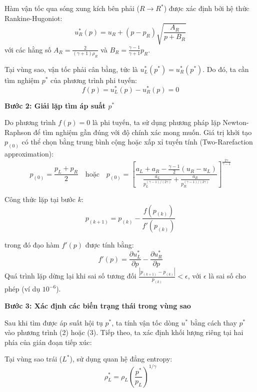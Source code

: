 Hàm vận tốc qua sóng xung kích bên phải ($R \to R^*$) được xác định bởi hệ thức Rankine-Hugoniot:
\begin{equation*}
    u_R^*(p) = u_R + (p - p_R) \sqrt{\frac{A_R}{p + B_R}}
\end{equation*}
với các hằng số $A_R = \frac{2}{(\gamma+1)\rho_R}$ và $B_R = \frac{\gamma-1}{\gamma+1}p_R$.

Tại vùng sao, vận tốc phải cân bằng, tức là $u_L^*(p^*) = u_R^*(p^*)$. Do đó, ta cần tìm nghiệm $p^*$ của phương trình phi tuyến:
\begin{equation*}
    f(p) = u_L^*(p) - u_R^*(p) = 0
\end{equation*}

\textbf{Bước 2: Giải lặp tìm áp suất $p^*$}

Do phương trình $f(p)=0$ là phi tuyến, ta sử dụng phương pháp lặp Newton-Raphson để tìm nghiệm gần đúng với độ chính xác mong muốn. Giá trị khởi tạo $p_{(0)}$ có thể chọn bằng trung bình cộng hoặc xấp xỉ tuyến tính (Two-Rarefaction approximation):
\begin{equation*}
    p_{(0)} = \frac{p_L + p_R}{2} \quad \text{hoặc} \quad p_{(0)} = \left[ \frac{a_L + a_R - \frac{\gamma-1}{2}(u_R - u_L)}{\frac{a_L}{p_L^{(\gamma-1)/(2\gamma)}} + \frac{a_R}{p_R^{(\gamma-1)/(2\gamma)}}} \right]^{\frac{2\gamma}{\gamma-1}}
\end{equation*}

Công thức lặp tại bước $k$:
\begin{equation*}
    p_{(k+1)} = p_{(k)} - \frac{f(p_{(k)})}{f'(p_{(k)})}
\end{equation*}

trong đó đạo hàm $f'(p)$ được tính bằng:
\begin{equation*}
    f'(p) = \frac{\partial u_L^*}{\partial p} - \frac{\partial u_R^*}{\partial p}
\end{equation*}
Quá trình lặp dừng lại khi sai số tương đối $\frac{|p_{(k+1)} - p_{(k)}|}{p_{(k)}} < \epsilon$, với $\epsilon$ là sai số cho phép (ví dụ $10^{-6}$).

\textbf{Bước 3: Xác định các biến trạng thái trong vùng sao}

Sau khi tìm được áp suất hội tụ $p^*$, ta tính vận tốc dòng $u^*$ bằng cách thay $p^*$ vào phương trình (2) hoặc (3). Tiếp theo, ta xác định khối lượng riêng tại hai phía của gián đoạn tiếp xúc:

Tại vùng sao trái ($L^*$), sử dụng quan hệ đẳng entropy:
\begin{equation*}
    \rho_L^* = \rho_L \left( \frac{p^*}{p_L} \right)^{1/\gamma}
\end{equation*}


